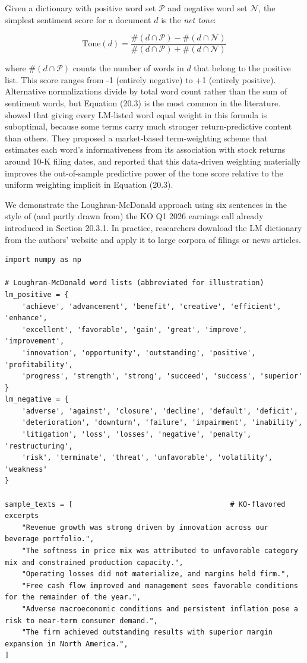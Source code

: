 Given a dictionary with positive word set $\mathcal{P}$ and negative word set $\mathcal{N}$, the simplest sentiment score for a document $d$ is the \textit{net tone}:

\begin{equation}
\text{Tone}(d) = \frac{\#(d \cap \mathcal{P}) - \#(d \cap \mathcal{N})}{\#(d \cap \mathcal{P}) + \#(d \cap \mathcal{N})}
\tag{20.3}
\end{equation}

where $\#(d \cap \mathcal{P})$ counts the number of words in $d$ that belong to the positive list. This score ranges from -1 (entirely negative) to +1 (entirely positive). Alternative normalizations divide by total word count rather than the sum of sentiment words, but Equation (20.3) is the most common in the literature. \cite{jegadeesh2013word} showed that giving every LM-listed word equal weight in this formula is suboptimal, because some terms carry much stronger return-predictive content than others. They proposed a market-based term-weighting scheme that estimates each word's informativeness from its association with stock returns around 10-K filing dates, and reported that this data-driven weighting materially improves the out-of-sample predictive power of the tone score relative to the uniform weighting implicit in Equation (20.3).

We demonstrate the Loughran-McDonald approach using six sentences in the style of (and partly drawn from) the KO Q1 2026 earnings call already introduced in Section 20.3.1. In practice, researchers download the LM dictionary from the authors' website and apply it to large corpora of filings or news articles.

\begin{verbatim}
import numpy as np

# Loughran-McDonald word lists (abbreviated for illustration)
lm_positive = {
    'achieve', 'advancement', 'benefit', 'creative', 'efficient', 'enhance',
    'excellent', 'favorable', 'gain', 'great', 'improve', 'improvement',
    'innovation', 'opportunity', 'outstanding', 'positive', 'profitability',
    'progress', 'strength', 'strong', 'succeed', 'success', 'superior'
}
lm_negative = {
    'adverse', 'against', 'closure', 'decline', 'default', 'deficit',
    'deterioration', 'downturn', 'failure', 'impairment', 'inability',
    'litigation', 'loss', 'losses', 'negative', 'penalty', 'restructuring',
    'risk', 'terminate', 'threat', 'unfavorable', 'volatility', 'weakness'
}

sample_texts = [                                     # KO-flavored excerpts
    "Revenue growth was strong driven by innovation across our beverage portfolio.",
    "The softness in price mix was attributed to unfavorable category mix and constrained production capacity.",
    "Operating losses did not materialize, and margins held firm.",
    "Free cash flow improved and management sees favorable conditions for the remainder of the year.",
    "Adverse macroeconomic conditions and persistent inflation pose a risk to near-term consumer demand.",
    "The firm achieved outstanding results with superior margin expansion in North America.",
]
\end{verbatim}

